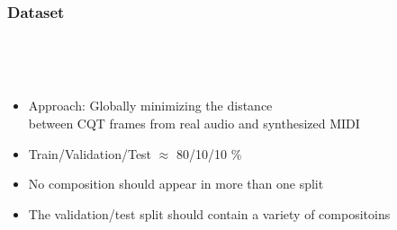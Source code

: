 \documentclass[dvipdfmx]{beamer}
\begin{document}
\begin{frame}[noframenumbering]
    \frametitle{Dataset}
    \\
     \yitemsquare
    \begin{yalign*}
        \begin{rcases*}
             \\
        \end{rcases*}
    \end{yalign*}
    \begin{itemize}
        \item Approach: Globally minimizing the distance \\
            between CQT frames from real audio and synthesized MIDI
    \end{itemize}
    \begin{itemize}
        \item Train/Validation/Test $\approx$ 80/10/10 \%
        \item No composition should appear in more than one split
        \item The validation/test split should contain a variety of compositoins
    \end{itemize}
\end{frame}
\end{document}
